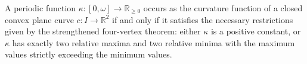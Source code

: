 A periodic function $\kappa: [0, \omega] \to \mathbb{R}_{\geq 0}$ occurs as the curvature function of a closed convex plane curve $c: I \to \mathbb{R}^2$ if and only if it satisfies the necessary restrictions given by the strengthened four-vertex theorem: either $\kappa$ is a positive constant, or $\kappa$ has exactly two relative maxima and two relative minima with the maximum values strictly exceeding the minimum values.
